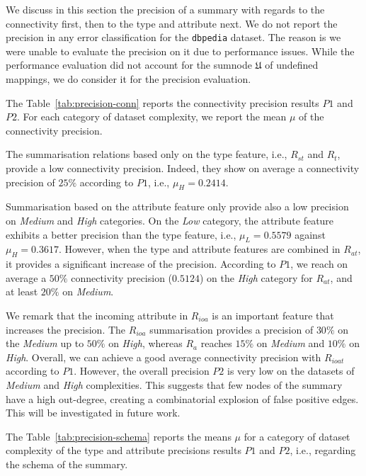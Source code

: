 We discuss in this section the precision of a summary with regards to the connectivity first, then to the type and attribute next. We do not report the precision in any error classification for the \texttt{dbpedia} dataset. The reason is we were unable to evaluate the precision on it due to performance issues. While the performance evaluation did not account for the sumnode $\mathfrak{U}$ of undefined mappings, we do consider it for the precision evaluation.


The Table~\ref{tab:precision-conn} reports the connectivity precision results $P1$ and $P2$. For each category of dataset complexity, we report the mean $\mu$ of the connectivity precision.

The summarisation relations based only on the type feature, i.e., $R_{st}$ and $R_t$, provide a low connectivity precision. Indeed, they show on average a connectivity precision of $25\%$ according to $P1$, i.e., $\mu_H=0.2414$.

Summarisation based on the attribute feature only provide also a low precision on \emph{Medium} and \emph{High} categories. On the \emph{Low} category, the attribute feature exhibits a better precision than the type feature, i.e., $\mu_L=0.5579$ against $\mu_H=0.3617$. However, when the type and attribute features are combined in $R_{at}$, it provides a significant increase of the precision. According to $P1$, we reach on average a $50\%$ connectivity precision ($0.5124$) on the \emph{High} category for $R_{at}$, and at least $20\%$ on \emph{Medium}.

We remark that the incoming attribute in $R_{ioa}$ is an important feature that increases the precision. The $R_{ioa}$ summarisation provides a precision of $30\%$ on the \emph{Medium} up to $50\%$ on \emph{High}, whereas $R_a$ reaches $15\%$ on \emph{Medium} and $10\%$ on \emph{High}. Overall, we can achieve a good average connectivity precision with $R_{ioat}$ according to $P1$. However, the overall precision $P2$ is very low on the datasets of \emph{Medium} and \emph{High} complexities. This suggests that few nodes of the summary have a high out-degree, creating a combinatorial explosion of false positive edges. This will be investigated in future work.




The Table~\ref{tab:precision-schema} reports the means $\mu$ for a category of dataset complexity of the type and attribute precisions results $P1$ and $P2$, i.e., regarding the schema of the summary.

